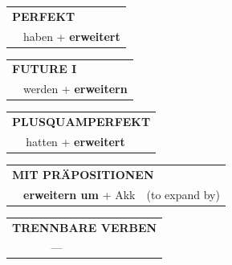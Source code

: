 \documentclass[10pt,a4paper]{revtex4-2}
\begin{document}
\begin{verbbox-acc}
\vspace{10pt}

\begin{tabular}{rl}
\multicolumn{2}{l}{\textbf{PERFEKT}}\\
& haben + \textbf{erweitert}\\
\end{tabular}
\hfill
\begin{tabular}{rl}
\multicolumn{2}{l}{\textbf{FUTURE I}}\\
& werden + \textbf{erweitern}\\
\end{tabular}
\hfill
\begin{tabular}{rl}
\multicolumn{2}{l}{\textbf{PLUSQUAMPERFEKT}}\\
& hatten + \textbf{erweitert}\\
\end{tabular}

\vspace{10pt}

\begin{tabular}{lll}
\multicolumn{3}{l}{\textbf{MIT PRÄPOSITIONEN}}\\
& \textbf{erweitern um} + Akk & (to expand by)\\
\end{tabular}
\hfill
\begin{tabular}{lll}
\multicolumn{3}{l}{\textbf{TRENNBARE VERBEN}}\\
& ---\\
\end{tabular}

\vspace{-5pt}
\end{verbbox-acc}
\end{document}
